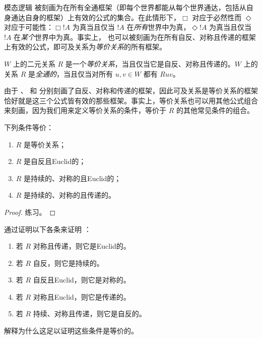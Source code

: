 \documentclass[../../../include/open-logic-section]{subfiles}
\begin{document}


模态逻辑  被刻画为在所有全通框架（即每个世界都能从每个世界通达，包括从自身通达自身的框架）上有效的公式的集合。在此情形下，$\Box$ 对应于必然性而 $\Diamond$ 对应于可能性：$\Box !A$ 为真当且仅当 $!A$ 在\emph{所有}世界中为真，$\Diamond !A$ 为真当且仅当 $!A$ 在\emph{某个}世界中为真。事实上， 也可以被刻画为在所有自反、对称且传递的框架上有效的公式，即可及关系为\emph{等价关系}的所有框架。

\begin{defn}
  $W$ 上的二元关系 $R$ 是一个\emph{等价关系}，当且仅当它是自反、对称且传递的。$W$ 上的关系 $R$ 是\emph{全通的}，当且仅当对所有 $u,v \in W$ 都有 $Ruv$。
\end{defn}

由于 、 和  分别刻画了自反、对称和传递的框架，因此可及关系是等价关系的框架恰好就是这三个公式皆有效的那些框架。事实上，等价关系也可以用其他公式组合来刻画，因为我们用来定义等价关系的条件，等价于 $R$ 的其他常见条件的组合。

\begin{prop}
  下列条件等价：
  \begin{enumerate}
  \item $R$ 是等价关系；
  \item $R$ 是自反且Euclid的；
  \item $R$ 是持续的、对称的且Euclid的；
  \item $R$ 是持续的、对称的且传递的。
  \end{enumerate}
\end{prop}

\begin{proof}
  练习。
\end{proof}

\begin{prob}
  通过证明以下各条来证明 ：
  \begin{enumerate}
  \item 若 $R$ 对称且传递，则它是Euclid的。
  \item 若 $R$ 自反，则它是持续的。
  \item 若 $R$ 自反且Euclid，则它是对称的。
  \item 若 $R$ 对称且Euclid，则它是传递的。
  \item 若 $R$ 持续、对称且传递，则它是自反的。
  \end{enumerate}
  解释为什么这足以证明这些条件是等价的。
\end{prob}
\end{document}
